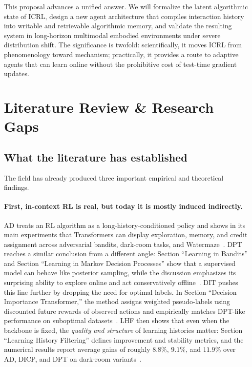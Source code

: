 \documentclass[10pt,twocolumn,letterpaper]{article}
\begin{document}
This proposal advances a unified answer. We will formalize the latent algorithmic state of ICRL, design a new agent architecture that compiles interaction history into writable and retrievable algorithmic memory, and validate the resulting system in long-horizon multimodal embodied environments under severe distribution shift. The significance is twofold: scientifically, it moves ICRL from phenomenology toward mechanism; practically, it provides a route to adaptive agents that can learn online without the prohibitive cost of test-time gradient updates.

\section{Literature Review \& Research Gaps}
\subsection{What the literature has established}
The field has already produced three important empirical and theoretical findings.

\paragraph{First, in-context RL is real, but today it is mostly induced indirectly.}
AD treats an RL algorithm as a long-history-conditioned policy and shows in its main experiments that Transformers can display exploration, memory, and credit assignment across adversarial bandits, dark-room tasks, and Watermaze~\cite{laskin2022ad}. DPT reaches a similar conclusion from a different angle: Section ``Learning in Bandits'' and Section ``Learning in Markov Decision Processes'' show that a supervised model can behave like posterior sampling, while the discussion emphasizes its surprising ability to explore online and act conservatively offline~\cite{lee2024dpt}. DIT pushes this line further by dropping the need for optimal labels. In Section ``Decision Importance Transformer,'' the method assigns weighted pseudo-labels using discounted future rewards of observed actions and empirically matches DPT-like performance on suboptimal datasets~\cite{dong2024dit}. LHF then shows that even when the backbone is fixed, the \emph{quality and structure} of learning histories matter: Section ``Learning History Filtering'' defines improvement and stability metrics, and the numerical results report average gains of roughly \(8.8\%\), \(9.1\%\), and \(11.9\%\) over AD, DICP, and DPT on dark-room variants~\cite{chen2025lhf}.
\end{document}
